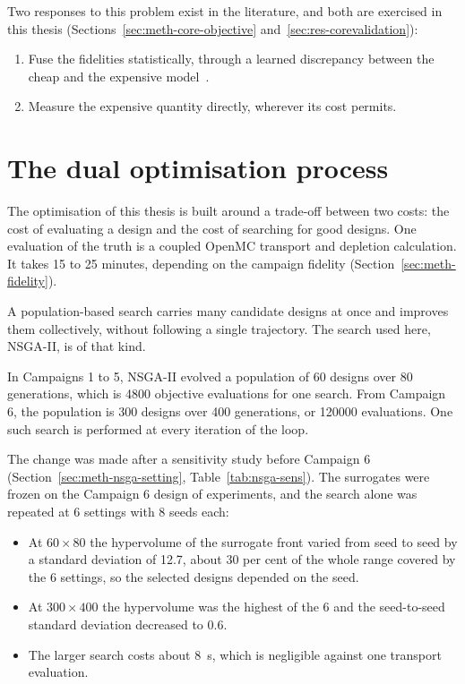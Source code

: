 Two responses to this problem exist in the literature, and both are
exercised in this thesis (Sections~\ref{sec:meth-core-objective}
and~\ref{sec:res-corevalidation}):

\begin{enumerate}
  \item Fuse the fidelities statistically, through a learned
        discrepancy between the cheap and the expensive
        model~\cite{kennedy_ohagan_2000,forrester_book_2008}.

  \item Measure the expensive quantity directly, wherever its cost
        permits.
\end{enumerate}

\section{The dual optimisation process}
\label{sec:bg-moo}

The optimisation of this thesis is built around a trade-off between two
costs: the cost of evaluating a design and the cost of searching for
good designs. One evaluation of the truth is a coupled OpenMC transport and depletion
calculation. It takes 15 to 25 minutes, depending on the
campaign fidelity (Section~\ref{sec:meth-fidelity}).

A population-based search carries many candidate designs at once and
improves them collectively, without following a single trajectory. The
search used here, NSGA-II, is of that kind.

In Campaigns 1 to 5, NSGA-II evolved a population of 60 designs over 80
generations, which is 4800 objective evaluations for one search. From
Campaign 6, the population is 300 designs over 400 generations, or
\num{120000} evaluations. One such search is performed at every
iteration of the loop.

The change was made after a sensitivity study before Campaign 6
(Section~\ref{sec:meth-nsga-setting}, Table~\ref{tab:nsga-sens}). The
surrogates were frozen on the Campaign 6 design of experiments, and
the search alone was repeated at 6 settings with 8 seeds each:

\begin{itemize}
  \item At $60\times80$ the hypervolume of the surrogate front varied
        from seed to seed by a standard deviation of 12.7, about 30
        per cent of the whole range covered by the 6 settings, so the
        selected designs depended on the seed.

  \item At $300\times400$ the hypervolume was the highest of the 6 and
        the seed-to-seed standard deviation decreased to 0.6.

  \item The larger search costs about \SI{8}{\second}, which is
        negligible against one transport evaluation.
\end{itemize}

